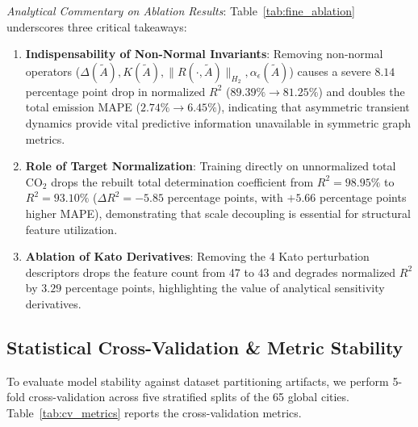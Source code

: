 \documentclass[journal]{IEEEtran}
\begin{document}
\textit{Analytical Commentary on Ablation Results}:
Table~\ref{tab:fine_ablation} underscores three critical takeaways:
\begin{enumerate}
    \item \textbf{Indispensability of Non-Normal Invariants}: Removing non-normal operators ($\Delta(\tilde{A}), K(\tilde{A}), \|R(\cdot,\tilde{A})\|_{H_2}, \alpha_\epsilon(\tilde{A})$) causes a severe $8.14$ percentage point drop in normalized $R^2$ ($89.39\% \to 81.25\%$) and doubles the total emission MAPE ($2.74\% \to 6.45\%$), indicating that asymmetric transient dynamics provide vital predictive information unavailable in symmetric graph metrics.
    \item \textbf{Role of Target Normalization}: Training directly on unnormalized total $\text{CO}_2$ drops the rebuilt total determination coefficient from $R^2 = 98.95\%$ to $R^2 = 93.10\%$ ($\Delta R^2 = -5.85$ percentage points, with $+5.66$ percentage points higher MAPE), demonstrating that scale decoupling is essential for structural feature utilization.
    \item \textbf{Ablation of Kato Derivatives}: Removing the 4 Kato perturbation descriptors drops the feature count from 47 to 43 and degrades normalized $R^2$ by $3.29$ percentage points, highlighting the value of analytical sensitivity derivatives.
\end{enumerate}

\subsection{Statistical Cross-Validation \& Metric Stability}
To evaluate model stability against dataset partitioning artifacts, we perform 5-fold cross-validation across five stratified splits of the 65 global cities. Table~\ref{tab:cv_metrics} reports the cross-validation metrics.

\begin{table}[htbp]
\caption{5-Fold Cross-Validation Metrics on Rebuilt Total $\text{CO}_2$}
\label{tab:cv_metrics}
\centering
{}
\end{table}
\end{document}

